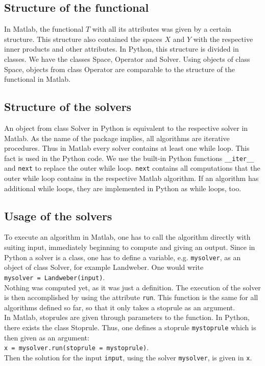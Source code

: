 \documentclass[12pt]{scrartcl}
\begin{document}
\subsection{Structure of the functional}
In Matlab, the functional $T$ with all its attributes was given by a certain structure. This structure also contained the spaces $X$ and $Y$ with the respective inner products and other attributes. In Python, this structure is divided in classes. We have the classes Space, Operator and Solver. Using objects of class Space, objects from class Operator are comparable to the structure of the functional in Matlab.
\subsection{Structure of the solvers}
An object from class Solver in Python is equivalent to the respective solver in Matlab. As the name of the package implies, all algorithms are iterative procedures. Thus in Matlab every solver contains at least one while loop. This fact is used in the Python code. We use the built-in Python functions \texttt{\_\_iter\_\_} and \texttt{next} to replace the outer while loop. \texttt{next} contains all computations that the outer while loop contains in the respective Matlab algorithm. If an algorithm has additional while loops, they are implemented in Python as while loops, too.
\subsection{Usage of the solvers}
To execute an algorithm in Matlab, one has to call the algorithm directly with suiting input, immediately beginning to compute and giving an output. Since in Python a solver is a class, one has to define a variable, e.g. \texttt{mysolver}, as an object of class Solver, for example Landweber. One would write\\
\texttt{mysolver = Landweber(input)}.\\
Nothing was computed yet, as it was just a definition. The execution of the solver is then accomplished by using the attribute \texttt{run}. This function is the same for all algorithms defined so far, so that it only takes a stoprule as an argument.\\
In Matlab, stoprules are given through parameters to the function. In Python, there exists the class Stoprule. Thus, one defines a stoprule \texttt{mystoprule} which is then given as an argument:\\
\texttt{x = mysolver.run(stoprule = mystoprule)}.\\
Then the solution for the input \texttt{input}, using the solver \texttt{mysolver}, is given in \texttt{x}.
\end{document}
